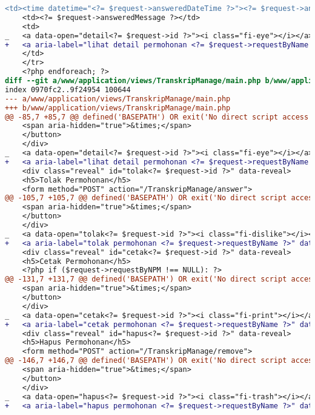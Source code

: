 \begin{lstlisting}[frame=single, label={lst:perbaikan_1.1.1_ikon_tanpa_nama}, language=diff, caption=Perbaikan Kriteria Sukses 1.1.1]
    <td><time datetime="<?= $request->answeredDateTime ?>"><?= $request->answeredDateString ?></time></td>
    <td><?= $request->answeredMessage ?></td>
    <td>
_   <a data-open="detail<?= $request->id ?>"><i class="fi-eye"></i></a>
+   <a aria-label="lihat detail permohonan <?= $request->requestByName ?>" data-open="detail<?= $request->id ?>"><i class="fi-eye"></i></a>
    </td>
    </tr>
    <?php endforeach; ?>
diff --git a/www/application/views/TranskripManage/main.php b/www/application/views/TranskripManage/main.php
index 0970fc2..9f24954 100644
--- a/www/application/views/TranskripManage/main.php
+++ b/www/application/views/TranskripManage/main.php
@@ -85,7 +85,7 @@ defined('BASEPATH') OR exit('No direct script access allowed');
    <span aria-hidden="true">&times;</span>
    </button>                                        
    </div>
_   <a data-open="detail<?= $request->id ?>"><i class="fi-eye"></i></a>
+   <a aria-label="lihat detail permohonan <?= $request->requestByName ?>" data-open="detail<?= $request->id ?>"><i class="fi-eye"></i></a>
    <div class="reveal" id="tolak<?= $request->id ?>" data-reveal>
    <h5>Tolak Permohonan</h5>
    <form method="POST" action="/TranskripManage/answer">
@@ -105,7 +105,7 @@ defined('BASEPATH') OR exit('No direct script access allowed');
    <span aria-hidden="true">&times;</span>
    </button>
    </div>
_   <a data-open="tolak<?= $request->id ?>"><i class="fi-dislike"></i></a>
+   <a aria-label="tolak permohonan <?= $request->requestByName ?>" data-open="tolak<?= $request->id ?>"><i class="fi-dislike"></i></a>
    <div class="reveal" id="cetak<?= $request->id ?>" data-reveal>
    <h5>Cetak Permohonan</h5>
    <?php if ($request->requestByNPM !== NULL): ?>
@@ -131,7 +131,7 @@ defined('BASEPATH') OR exit('No direct script access allowed');
    <span aria-hidden="true">&times;</span>
    </button>
    </div>
_   <a data-open="cetak<?= $request->id ?>"><i class="fi-print"></i></a>
+   <a aria-label="cetak permohonan <?= $request->requestByName ?>" data-open="cetak<?= $request->id ?>"><i class="fi-print"></i></a>
    <div class="reveal" id="hapus<?= $request->id ?>" data-reveal>
    <h5>Hapus Permohonan</h5>
    <form method="POST" action="/TranskripManage/remove">
@@ -146,7 +146,7 @@ defined('BASEPATH') OR exit('No direct script access allowed');
    <span aria-hidden="true">&times;</span>
    </button>
    </div>
_   <a data-open="hapus<?= $request->id ?>"><i class="fi-trash"></i></a>
+   <a aria-label="hapus permohonan <?= $request->requestByName ?>" data-open="hapus<?= $request->id ?>"><i class="fi-trash"></i></a>

\end{lstlisting}
